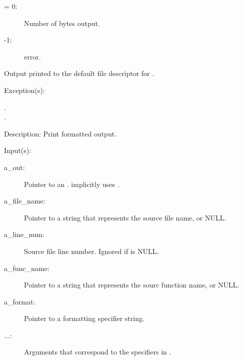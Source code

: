 \begin{capi}
\begin{capilist}
\begin{description}
			\begin{description}\item[]
			\item[{\gt}= 0: ]
				Number of bytes output.
			\item[-1: ]
				 error.
			\end{description}
		\item{Output printed to the default file descriptor for
			.}
		\end{description}
	\item[Exception(s): ]
		\begin{description}\item[]
		\item[.]
		\item[.]
		\end{description}
	\item[Description: ]
		Print formatted output.
	\end{capilist}
\label{out_put_e}
\label{_cw_out_put_e}
	\begin{capilist}
	\item[Input(s): ]
		\begin{description}\item[]
		\item[a\_out: ]
			Pointer to an .
			 implicitly uses
			.
		\item[a\_file\_name: ]
			Pointer to a string that represents the source file
			name, or NULL.
		\item[a\_line\_num: ]
			Source file line number.  Ignored if
			 is NULL.
		\item[a\_func\_name: ]
			Pointer to a string that represents the sourc function
			name, or NULL.
		\item[a\_format: ]
			Pointer to a formatting specifier string.
		\item[...: ]
			Arguments that correspond to the specifiers in
			.
		\end{description}

\end{capilist}
\end{capi}
